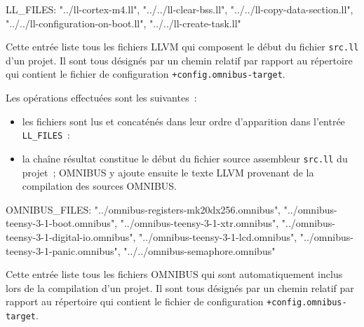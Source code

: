 
\begin{OMNIBUS}
LL_FILES:
  "../ll-cortex-m4.ll",
  "../../ll-clear-bss.ll",
  "../../ll-copy-data-section.ll",
  "../../ll-configuration-on-boot.ll",
  "../../ll-create-task.ll"
\end{OMNIBUS}

Cette entrée liste tous les fichiers LLVM qui composent le début du fichier \texttt{src.ll} d'un projet. Il sont tous désignés par un chemin relatif par rapport au répertoire qui contient le fichier de configuration \texttt{+config.omnibus-target}.

Les opérations effectuées sont les suivantes~:
\begin{itemize}
  \item les fichiers sont lus et concaténés dans leur ordre d'apparition dans l'entrée \texttt{LL\_FILES}~:
  \item la chaîne résultat constitue le début du fichier source assembleur \texttt{src.ll} du projet~; OMNIBUS y ajoute ensuite le texte LLVM provenant de la compilation des sources OMNIBUS.
\end{itemize}














\begin{OMNIBUS}
OMNIBUS_FILES:
  "../omnibus-registers-mk20dx256.omnibus",
  "../omnibus-teensy-3-1-boot.omnibus",
  "../omnibus-teensy-3-1-xtr.omnibus",
  "../omnibus-teensy-3-1-digital-io.omnibus",
  "../omnibus-teensy-3-1-lcd.omnibus",
  "../omnibus-teensy-3-1-panic.omnibus",
  "../../omnibus-semaphore.omnibus"
\end{OMNIBUS}

Cette entrée liste tous les fichiers OMNIBUS qui sont automatiquement inclus lors de la compilation d'un projet. Il sont tous désignés par un chemin relatif par rapport au répertoire qui contient le fichier de configuration \texttt{+config.omnibus-target}.








